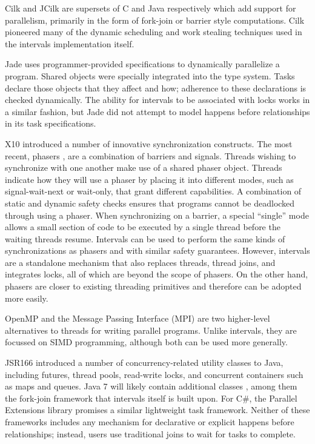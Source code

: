 Cilk \cite{Blumofe1995, Frigo1998} and JCilk \cite{Danaher2005} are
supersets of C and Java respectively which add support for
parallelism, primarily in the form of fork-join or barrier style
computations. Cilk pioneered many of the dynamic scheduling and work
stealing techniques used in the intervals implementation itself.

Jade \cite{Rinard1998} uses programmer-provided specifications to
dynamically parallelize a program. Shared objects were specially
integrated into the type system. Tasks declare those objects that they
affect and how; adherence to these declarations is checked
dynamically. The ability for intervals to be associated with locks
works in a similar fashion, but Jade did not attempt to model happens
before relationships in its task specifications.

X10 \cite{Charles2005, Saraswat2010} introduced a number of innovative
synchronization constructs. The most recent, phasers
\cite{Shirako2008, Shirako2010}, are a combination of barriers and
signals. Threads wishing to synchronize with one another make use of a
shared phaser object.  Threads indicate how they will use a phaser by
placing it into different modes, such as signal-wait-next or
wait-only, that grant different capabilities. A combination of static
and dynamic safety checks ensures that programs cannot be deadlocked
through using a phaser. When synchronizing on a barrier, a special
“single” mode allows a small section of code to be executed by a
single thread before the waiting threads resume. Intervals can be used
to perform the same kinds of synchronizations as phasers and with
similar safety guarantees. However, intervals are a standalone
mechanism that also replaces threads, thread joins, and integrates
locks, all of which are beyond the scope of phasers. On the other
hand, phasers are closer to existing threading primitives and
therefore can be adopted more easily.

OpenMP \cite{OpenMP2008} and the Message Passing Interface (MPI)
\cite{MPI2009} are two higher-level alternatives to threads for
writing parallel programs. Unlike intervals, they are focussed on SIMD
programming, although both can be used more generally.

JSR166 \cite{Lea2004} introduced a number of concurrency-related
utility classes to Java, including futures, thread pools, read-write
locks, and concurrent containers such as maps and queues. Java 7 will
likely contain additional classes \cite{Lea2006}, among them the
fork-join framework that intervals itself is built upon. For C\#, the
Parallel Extensions \cite{Leijen2009} library promises a similar
lightweight task framework.  Neither of these frameworks includes any
mechanism for declarative or explicit happens before relationships;
instead, users use traditional joins to wait for tasks to complete.

